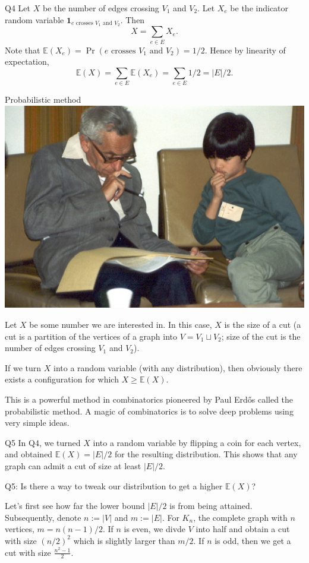 \documentclass[t]{beamer}
\def\ge{\geqslant}
\begin{document}
\begin{frame}{Q4}
  Let $X$ be the number of edges crossing $V_1$ and $V_2$. Let $X_e$ be the indicator random variable $\mathbf{1}_\text{$e$ crosses $V_1$ and $V_2$}$. Then
  \[X = \sum_{e \in E} X_e. \]
  Note that $\mathbb{E}(X_e) = \Pr(\text{$e$ crosses $V_1$ and $V_2$}) = 1/2$. Hence by linearity of expectation, 
  \[\mathbb{E}(X) = \sum_{e \in E} \mathbb{E}(X_e) = \sum_{e \in E} 1/2= |E|/2.\]
\end{frame}
\begin{frame}{Probabilistic method}
  \includegraphics[scale=0.35]{Paul_Erdos_with_Terence_Tao.jpg}
  \par Let $X$ be some number we are interested in. In this case, $X$ is the size of a cut (a cut is a partition of the vertices of a graph into $V = V_1 \sqcup V_2$; size of the cut is the number of edges crossing $V_1$ and $V_2$). 
  \par If we turn $X$ into a random variable (with any distribution), then obviously there exists a configuration for which $X \ge \mathbb{E}(X)$. 
  \par This is a powerful method in combinatorics pioneered by Paul Erd\H{o}s called the probabilistic method. A magic of combinatorics is to solve deep problems using very simple ideas. 
\end{frame}
\begin{frame}{Q5}
  In Q4, we turned $X$ into a random variable by flipping a coin for each vertex, and obtained $\mathbb{E}(X) = |E|/2$ for the resulting distribution. This shows that any graph can admit a cut of size at least $|E|/2$. 
  \par Q5: Is there a way to tweak our distribution to get a higher $\mathbb{E}(X)$? 
  \par Let's first see how far the lower bound $|E|/2$ is from being attained. Subsequently, denote $n := |V|$ and $m := |E|$. For $K_n$, the complete graph with $n$ vertices, $m = n(n-1)/2$. If $n$ is even, we divde $V$ into half and obtain a cut with size $(n/2)^2$ which is slightly larger than $m/2$. If $n$ is odd, then we get a cut with size $\frac{n^2-1}{2}$. 
\end{frame}
\end{document}
